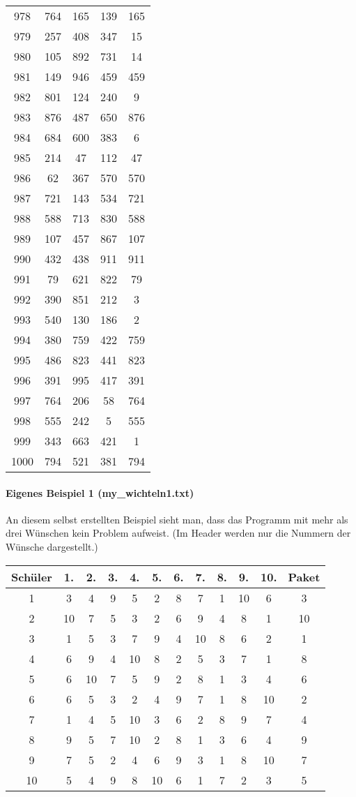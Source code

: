 \documentclass[a4paper,10pt,ngerman]{scrartcl}
\begin{document}
\begin{longtable}[c]{c|c|c|c|c}
    978 & 764 & 165 & 139 & 165 \\
    979 & 257 & 408 & 347 & 15 \\
    980 & 105 & 892 & 731 & 14 \\
    981 & 149 & 946 & 459 & 459 \\
    982 & 801 & 124 & 240 & 9 \\
    983 & 876 & 487 & 650 & 876 \\
    984 & 684 & 600 & 383 & 6 \\
    985 & 214 & 47 & 112 & 47 \\
    986 & 62 & 367 & 570 & 570 \\
    987 & 721 & 143 & 534 & 721 \\
    988 & 588 & 713 & 830 & 588 \\
    989 & 107 & 457 & 867 & 107 \\
    990 & 432 & 438 & 911 & 911 \\
    991 & 79 & 621 & 822 & 79 \\
    992 & 390 & 851 & 212 & 3 \\
    993 & 540 & 130 & 186 & 2 \\
    994 & 380 & 759 & 422 & 759 \\
    995 & 486 & 823 & 441 & 823 \\
    996 & 391 & 995 & 417 & 391 \\
    997 & 764 & 206 & 58 & 764 \\
    998 & 555 & 242 & 5 & 555 \\
    999 & 343 & 663 & 421 & 1 \\
    1000 & 794 & 521 & 381 & 794
\end{longtable}

\paragraph{Eigenes Beispiel 1 (my\_wichteln1.txt)}
An diesem selbst erstellten Beispiel sieht man, dass das Programm mit mehr als drei Wünschen kein Problem aufweist.
(Im Header werden nur die Nummern der Wünsche dargestellt.)
\begin{longtable}[c]{c|c|c|c|c|c|c|c|c|c|c|c}
    Schüler & 1. & 2. & 3. & 4. & 5. & 6. & 7. & 8. & 9. & 10. & Paket \\
    \hline
    \endhead
    1 & 3 & 4 & 9 & 5 & 2 & 8 & 7 & 1 & 10 & 6 & 3 \\
    2 & 10 & 7 & 5 & 3 & 2 & 6 & 9 & 4 & 8 & 1 & 10 \\
    3 & 1 & 5 & 3 & 7 & 9 & 4 & 10 & 8 & 6 & 2 & 1 \\
    4 & 6 & 9 & 4 & 10 & 8 & 2 & 5 & 3 & 7 & 1 & 8 \\
    5 & 6 & 10 & 7 & 5 & 9 & 2 & 8 & 1 & 3 & 4 & 6 \\
    6 & 6 & 5 & 3 & 2 & 4 & 9 & 7 & 1 & 8 & 10 & 2 \\
    7 & 1 & 4 & 5 & 10 & 3 & 6 & 2 & 8 & 9 & 7 & 4 \\
    8 & 9 & 5 & 7 & 10 & 2 & 8 & 1 & 3 & 6 & 4 & 9 \\
    9 & 7 & 5 & 2 & 4 & 6 & 9 & 3 & 1 & 8 & 10 & 7 \\
    10 & 5 & 4 & 9 & 8 & 10 & 6 & 1 & 7 & 2 & 3 & 5
\end{longtable}
\end{document}

